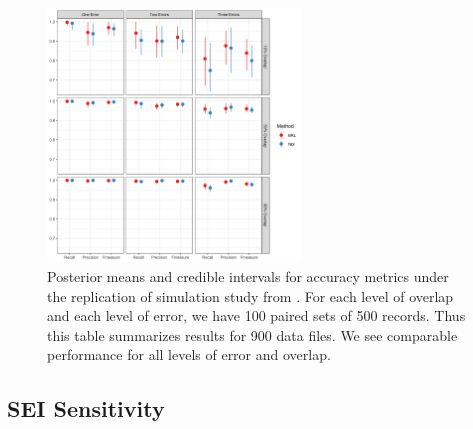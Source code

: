 \documentclass[ba]{imsart}
\begin{document}
	\begin{figure}[t]
		\begin{center}
			\includegraphics[width=0.6\textwidth]{../notes/figures/sadinle_sim_plot2} 
			\caption{Posterior means and credible intervals for accuracy metrics under the replication of simulation study from \cite{sadinle_bayesian_2017}. For each level of overlap and each level of error, we have 100 paired sets of 500 records. Thus this table summarizes results for 900 data files. We see comparable performance for all levels of error and overlap.}
			\label{fig:sadinle_simulation}
		\end{center}
	\end{figure}

	\hypertarget{SEI-sensitivity}{%
	\subsection{SEI Sensitivity}\label{SEI-sensitivity}}
\end{document}
